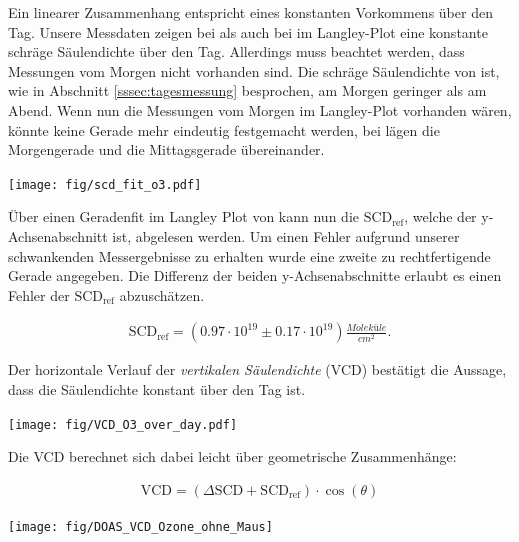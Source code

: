 \documentclass[12pt, a4paper, bibliography=totoc]{scrartcl}
\begin{document}
\begin{multicols}{2}
Ein linearer Zusammenhang entspricht eines konstanten Vorkommens über den Tag. 
Unsere Messdaten zeigen bei  als auch bei  im Langley-Plot eine konstante schräge Säulendichte über den Tag.
Allerdings muss beachtet werden, dass Messungen vom Morgen nicht vorhanden sind.
Die schräge Säulendichte von  ist, wie in Abschnitt \ref{sssec:tagesmessung} besprochen, am Morgen geringer als am Abend.
Wenn nun die Messungen vom Morgen im Langley-Plot vorhanden wären, könnte keine Gerade mehr eindeutig festgemacht werden, bei  lägen die Morgengerade und die Mittagsgerade übereinander.

\begin{center}
	\texttt{[image: fig/scd\_fit\_o3.pdf]}
	\label{fig:scd_fit_o3}
\end{center}

Über einen Geradenfit im Langley Plot von  kann nun die $\text{SCD}_\text{ref}$, welche der y-Achsenabschnitt ist, abgelesen werden. Um einen Fehler aufgrund unserer schwankenden Messergebnisse zu erhalten wurde eine zweite zu rechtfertigende Gerade angegeben. Die Differenz der beiden y-Achsenabschnitte erlaubt es einen Fehler der $\text{SCD}_\text{ref}$ abzuschätzen.
 
\begin{align}
	\text{SCD}_\text{ref}= (0.97 \cdot 10^{19}\pm 0.17 \cdot 10^{19}) \si{\frac{Moleküle}{cm^2}}.
\end{align}	

Der horizontale Verlauf der \textit{vertikalen Säulendichte} (VCD) bestätigt die Aussage, dass die  Säulendichte konstant über den Tag ist.

\begin{center}
	\texttt{[image: fig/VCD\_O3\_over\_day.pdf]}
	\label{fig:VCD_O3_over_day}
\end{center} 

Die VCD berechnet sich dabei leicht über geometrische Zusammenhänge: 

\begin{align}
    \text{VCD} = ( \Delta \text{SCD} + \text{SCD}_\text{ref}) \cdot \cos(\theta)
\end{align}

\begin{center}
	\texttt{[image: fig/DOAS\_VCD\_Ozone\_ohne\_Maus]}
	\label{fig:DOAS_satelit}
\end{center} 


\end{multicols}
\end{document}
